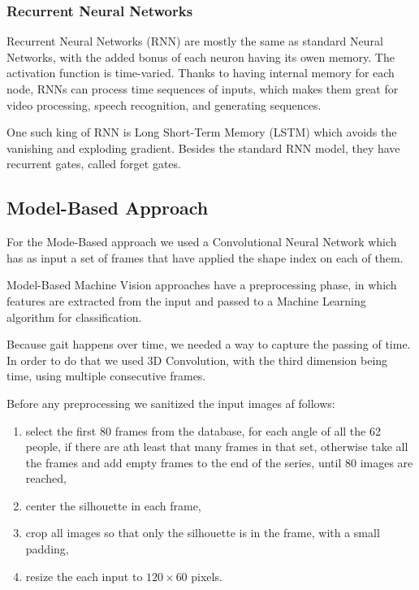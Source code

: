 \documentclass[12pt]{article}
\theoremstyle{definition}
\begin{document}
	\subsubsection{Recurrent Neural Networks}

	Recurrent Neural Networks (RNN) are mostly the same as standard Neural Networks, with the added bonus of each neuron having its owen memory. The activation function is time-varied. Thanks to having internal memory for each node, RNNs can process time sequences of inputs, which makes them great for video processing, speech recognition, and generating sequences.

	One such king of RNN is Long Short-Term Memory (LSTM) \cite{lstm} which avoids the vanishing and exploding gradient. Besides the standard RNN model, they have recurrent gates, called forget gates.


	\subsection{Model-Based Approach}

	For the Mode-Based approach we used a Convolutional Neural Network which has as input a set of frames that have applied the shape index on each of them.

	Model-Based Machine Vision approaches have a preprocessing phase, in which features are extracted from the input and passed to a Machine Learning algorithm for classification.

	Because gait happens over time, we needed a way to capture the passing of time. In order to do that we used 3D Convolution, with the third dimension being time, using multiple consecutive frames.

	Before any preprocessing we sanitized the input images af follows:
	\begin{enumerate}
		\item select the first 80 frames from the database, for each angle of all the 62 people, if there are ath least that many frames in that set, otherwise take all the frames and add empty frames to the end of the series, until 80 images are reached,
		\item center the silhouette in each frame,
		\item crop all images so that only the silhouette is in the frame, with a small padding,
		\item resize the each input to $120 \times 60$ pixels.
	\end{enumerate}
\end{document}
